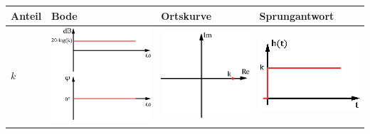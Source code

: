 \begin{tabular}{>{\centering\arraybackslash}p{1.5cm}|>{\centering\arraybackslash}p{2.5cm}|>{\centering\arraybackslash}p{2cm}|>{\centering\arraybackslash}p{2.5cm}}
	   \rule[-2ex]{0pt}{5.5ex} Anteil  & Bode  & Ortskurve  & Sprungantwort  \\ 
\hline \rule[-2ex]{0pt}{5.5ex} $k$  & \includegraphics[scale = 0.3]{../fig/bode_k.eps} & \includegraphics[scale = 0.4]{../fig/ort_k.eps} & \includegraphics[scale = 0.5]{../fig/spr_k.eps} \\ 

\end{tabular}
